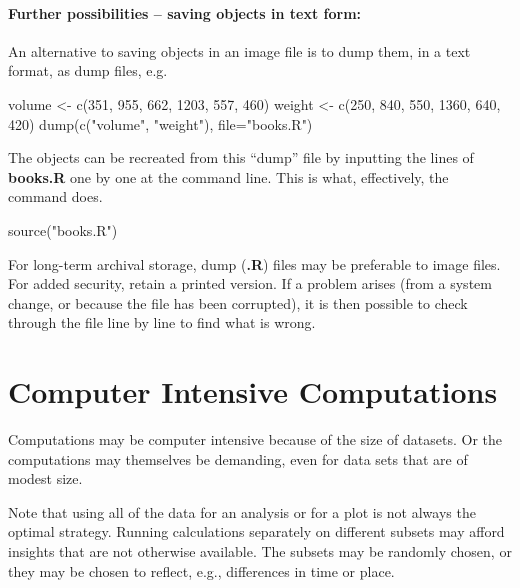 \paragraph{Further possibilities -- saving objects in text form:}
An alternative to saving objects in an
image file is to dump them, in a text format, as dump files, e.g.
\begin{Schunk}
\begin{Sinput}
volume <- c(351, 955, 662, 1203, 557, 460)
weight <- c(250, 840, 550, 1360, 640, 420)
dump(c("volume", "weight"), file="books.R")
\end{Sinput}
\end{Schunk}
The objects can be recreated
 from this ``dump'' file by inputting the
lines of \textbf{books.R} one by one at the command line. This is what,
effectively, the command  does.
\begin{Schunk}
\begin{Sinput}
source("books.R")
\end{Sinput}
\end{Schunk}

For long-term archival storage, dump (\textbf{.R}) files may be
preferable to image files.  For added security, retain a printed
version.  If a problem arises (from a system change, or because the
file has been corrupted), it is then possible to check through the
file line by line to find what is wrong.

\section{Computer Intensive Computations}\label{sec:large-dset}
Computations may be computer intensive because of the size of
datasets.  Or the computations may themselves be demanding, even for
data sets that are of modest size.

Note that using all of the data for an analysis or for a plot is not
always the optimal strategy.  Running calculations separately on
different subsets may afford insights that are not otherwise
available. The subsets may be randomly chosen, or they may be chosen
to reflect, e.g., differences in time or place.

